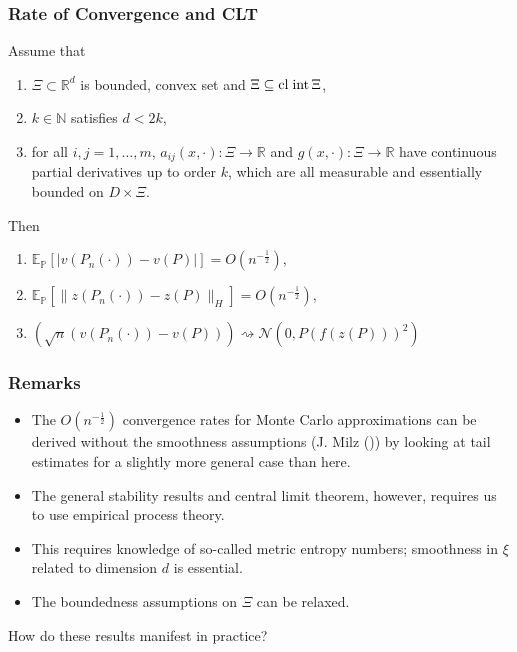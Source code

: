 \documentclass[aspectratio=169,xcolor=dvipsnames,10pt]{beamer}
\begin{document}
\begin{frame}\frametitle{Rate of Convergence and CLT}
\begin{theorem}\label{t5}
Assume that
\begin{enumerate}
    \item $\Xi\subset\mathbb R^d$ is bounded, convex set and $\Xi\subseteq{\rm cl}\;{\rm int}\,\Xi$,
    \item $k\in\mathbb N$ satisfies $d<2k$,
    \item for all $i,j=1,\ldots,m$, $a_{ij}(x,\cdot):\Xi\to\mathbb R$ and $g(x,\cdot):\Xi\to\mathbb R$ have continuous partial derivatives up to order $k$, which are all measurable and essentially bounded on $D\times\Xi$.
\end{enumerate}
Then
\begin{enumerate}
    \item $\mathbb E_{\mathbb P}[|v(P_{n}(\cdot))-v(P)|] = O(n^{-\frac12})$,
    \item $\mathbb E_{\mathbb P}[\|z(P_{n}(\cdot))-z(P)\|_{H}] = O(n^{-\frac12})$,
    \item  $(\sqrt{n}(v(P_n(\cdot))-v(P))) \rightsquigarrow \mathcal{N}(0,P(f(z(P)))^{2})$
\end{enumerate}
\end{theorem}    
\end{frame}

\begin{frame}\frametitle{Remarks}
\begin{exampleblock}{}
    \begin{itemize}
        \item The $O(n^{-\frac{1}{2}})$ convergence rates for Monte Carlo approximations can be derived without the smoothness assumptions (J. Milz ()) by looking at tail estimates for a slightly more general case than here. 
        \item The general stability results and central limit theorem, however, requires us to use empirical process theory.
        \item This requires knowledge of so-called metric entropy numbers; smoothness in $\xi$ related to dimension $d$ is essential.
        \item The boundedness assumptions on $\Xi$ can be relaxed.
    \end{itemize}
\end{exampleblock}\pause
\begin{exampleblock}{}
    \centering
    How do these results manifest in practice?
\end{exampleblock}
\end{frame}
\end{document}
